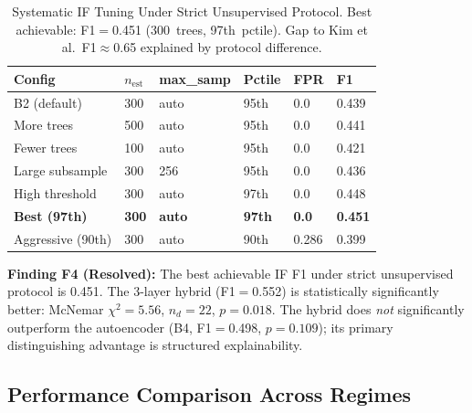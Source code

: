 \documentclass[journal,10pt,twoside]{IEEEtran}
\begin{document}
\begin{table}[t]
\caption{Systematic IF Tuning Under Strict Unsupervised Protocol.
  Best achievable: F1$=$0.451 (300~trees, 97th~pctile). Gap to
  Kim et al.\ F1$\approx$0.65 explained by protocol difference.}
\label{tab:if_tuning}
\centering\small
\begin{tabular}{@{}L{2.1cm}P{0.65cm}P{1.0cm}P{0.8cm}P{0.7cm}P{0.55cm}@{}}
\toprule
\textbf{Config} & $n_{\mathrm{est}}$ & \textbf{max\_samp}
  & \textbf{Pctile} & \textbf{FPR} & \textbf{F1} \\
\midrule
B2 (default)    & 300 & auto & 95th & 0.0   & 0.439 \\
More trees      & 500 & auto & 95th & 0.0   & 0.441 \\
Fewer trees     & 100 & auto & 95th & 0.0   & 0.421 \\
Large subsample & 300 & 256  & 95th & 0.0   & 0.436 \\
High threshold  & 300 & auto & 97th & 0.0   & 0.448 \\
\textbf{Best (97th)} & \textbf{300} & \textbf{auto}
  & \textbf{97th} & \textbf{0.0} & \textbf{0.451} \\
Aggressive (90th) & 300 & auto & 90th & 0.286 & 0.399 \\
\bottomrule
\end{tabular}
\end{table}

\noindent\textbf{Finding F4 (Resolved):} The best achievable IF F1
under strict unsupervised protocol is 0.451.  The 3-layer hybrid
(F1$=$0.552) is statistically significantly better: McNemar
$\chi^2{=}5.56$, $n_d{=}22$, $p{=}0.018$.  The hybrid does
\emph{not} significantly outperform the autoencoder (B4,
F1$=$0.498, $p{=}0.109$); its primary distinguishing advantage
is structured explainability.

\subsection{Performance Comparison Across Regimes}
\end{document}
